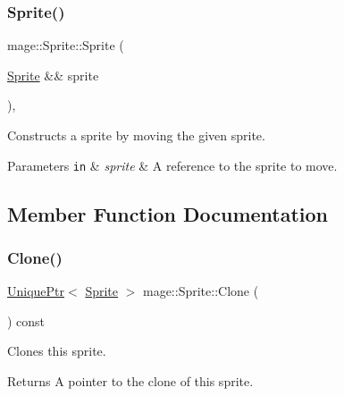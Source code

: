 \subsubsection{\texorpdfstring{Sprite()}{Sprite()}\hspace{0.1cm}{\footnotesize\ttfamily [3/3]}}
{\footnotesize\ttfamily mage\+::\+Sprite\+::\+Sprite (\begin{DoxyParamCaption}\item[{\hyperlink{classmage_1_1_sprite}{Sprite} \&\&}]{sprite }\end{DoxyParamCaption})\hspace{0.3cm}{\ttfamily [protected]}, {\ttfamily [default]}}

Constructs a sprite by moving the given sprite.


\begin{DoxyParams}[1]{Parameters}
\mbox{\tt in}  & {\em sprite} & A reference to the sprite to move. \\
\hline
\end{DoxyParams}


\subsection{Member Function Documentation}
\hypertarget{classmage_1_1_sprite_a66e27a8a98ac5a4289e8440ef8193718}{}\label{classmage_1_1_sprite_a66e27a8a98ac5a4289e8440ef8193718} 
\subsubsection{\texorpdfstring{Clone()}{Clone()}}
{\footnotesize\ttfamily \hyperlink{namespacemage_a3316d7143a973e37adf1110f2e80ca31}{Unique\+Ptr}$<$ \hyperlink{classmage_1_1_sprite}{Sprite} $>$ mage\+::\+Sprite\+::\+Clone (\begin{DoxyParamCaption}{ }\end{DoxyParamCaption}) const}

Clones this sprite.

\begin{DoxyReturn}{Returns}
A pointer to the clone of this sprite. 
\end{DoxyReturn}
\hypertarget{classmage_1_1_sprite_a214890d7da493bccadb2327b8c7ffb09}{}\label{classmage_1_1_sprite_a214890d7da493bccadb2327b8c7ffb09} 
